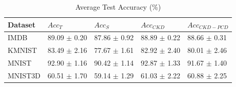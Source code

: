 \begin{table}
\caption{Average Test Accuracy (\%)}
\label{tab:test-acc}
\begin{tabular}{lllll}
\toprule
Dataset & $Acc_T$ & $Acc_S$ & $Acc_{CKD}$ & $Acc_{CKD-PCD}$ \\
\midrule
IMDB & 89.09 $\pm$ 0.20 & 87.86 $\pm$ 0.92 & 88.89 $\pm$ 0.22 & 88.66 $\pm$ 0.31 \\
KMNIST & 83.49 $\pm$ 2.16 & 77.67 $\pm$ 1.61 & 82.92 $\pm$ 2.40 & 80.01 $\pm$ 2.46 \\
MNIST & 92.90 $\pm$ 1.16 & 90.42 $\pm$ 1.14 & 92.87 $\pm$ 1.33 & 91.67 $\pm$ 1.40 \\
MNIST3D & 60.51 $\pm$ 1.70 & 59.14 $\pm$ 1.29 & 61.03 $\pm$ 2.22 & 60.88 $\pm$ 2.25 \\
\bottomrule
\end{tabular}
\end{table}
